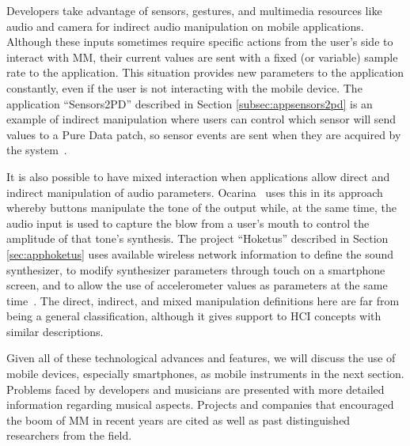 Developers take advantage of sensors, gestures, and  multimedia resources like audio and camera for indirect audio manipulation on mobile applications.
Although these inputs sometimes require specific actions from the user's side to interact with MM, their current values are sent with a fixed (or variable) sample rate to the application.
This situation provides new parameters to the application constantly, even if the user is not interacting with the mobile device.
The application ``Sensors2PD'' described in Section \ref{subsec:appsensors2pd} is an example of indirect manipulation where users can control which sensor will send values to a Pure Data patch, so sensor events are sent when they are acquired by the system~\citep{deCarvalhoJunior2014sensors2pd}.

It is also possible to have mixed interaction when applications allow direct and indirect manipulation of audio parameters.
Ocarina~\citep{Wang2014ocarina} uses this in its approach whereby buttons manipulate the tone of the output while, at the same time, the audio input is used to capture the blow from a user's mouth to control the amplitude of that tone's synthesis.
The project ``Hoketus'' described in Section \ref{sec:apphoketus} uses available wireless network information to define the sound synthesizer, to modify synthesizer parameters through touch on a smartphone screen, and to allow the use of accelerometer values as parameters at the same time~\citep{Bandeira2014notes,deCarvalhoJunior2015indoor}.
The direct, indirect, and mixed manipulation definitions here are far from being a general classification, although it gives support to HCI concepts with similar descriptions.

Given all of these technological advances and features, we will discuss the use of mobile devices, especially smartphones, as mobile instruments in the next section.
Problems faced by developers and musicians are presented with more detailed information regarding musical aspects.
Projects and companies that encouraged the boom of MM in recent years are cited as well as past distinguished researchers from the field.















